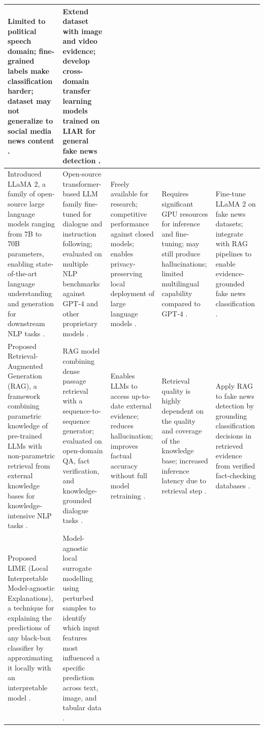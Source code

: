 \documentclass[runningheads]{llncs}
\begin{document}
\begin{longtable}{|p{}|p{}|p{}|p{}|p{}|}
Limited to political speech domain; fine-grained labels make classification harder; dataset may not generalize to social media news content \cite{Wang2017Liar}. &
Extend dataset with image and video evidence; develop cross-domain transfer learning models trained on LIAR for general fake news detection \cite{Wang2017Liar}. \\ \hline
Introduced LLaMA 2, a family of open-source large language models ranging from 7B to 70B parameters, enabling state-of-the-art language understanding and generation for downstream NLP tasks \cite{Touvron2023Llama2}. &
Open-source transformer-based LLM family fine-tuned for dialogue and instruction following; evaluated on multiple NLP benchmarks against GPT-4 and other proprietary models \cite{Touvron2023Llama2}. &
Freely available for research; competitive performance against closed models; enables privacy-preserving local deployment of large language models \cite{Touvron2023Llama2}. &
Requires significant GPU resources for inference and fine-tuning; may still produce hallucinations; limited multilingual capability compared to GPT-4 \cite{Touvron2023Llama2}. &
Fine-tune LLaMA 2 on fake news datasets; integrate with RAG pipelines to enable evidence-grounded fake news classification \cite{Touvron2023Llama2}. \\ \hline
Proposed Retrieval-Augmented Generation (RAG), a framework combining parametric knowledge of pre-trained LLMs with non-parametric retrieval from external knowledge bases for knowledge-intensive NLP tasks \cite{Lewis2020RAG}. &
RAG model combining dense passage retrieval with a sequence-to-sequence generator; evaluated on open-domain QA, fact verification, and knowledge-grounded dialogue tasks \cite{Lewis2020RAG}. &
Enables LLMs to access up-to-date external evidence; reduces hallucination; improves factual accuracy without full model retraining \cite{Lewis2020RAG}. &
Retrieval quality is highly dependent on the quality and coverage of the knowledge base; increased inference latency due to retrieval step \cite{Lewis2020RAG}. &
Apply RAG to fake news detection by grounding classification decisions in retrieved evidence from verified fact-checking databases \cite{Lewis2020RAG}. \\ \hline
Proposed LIME (Local Interpretable Model-agnostic Explanations), a technique for explaining the predictions of any black-box classifier by approximating it locally with an interpretable model \cite{Ribeiro2016LIME}. &
Model-agnostic local surrogate modelling using perturbed samples to identify which input features most influenced a specific prediction across text, image, and tabular data \cite{Ribeiro2016LIME}. &

\end{longtable}
\end{document}

